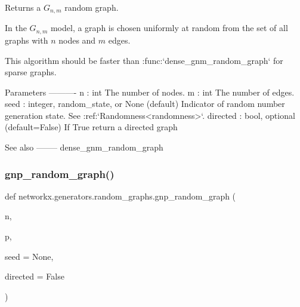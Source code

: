 \begin{DoxyVerb}Returns a $G_{n,m}$ random graph.

In the $G_{n,m}$ model, a graph is chosen uniformly at random from the set
of all graphs with $n$ nodes and $m$ edges.

This algorithm should be faster than :func:`dense_gnm_random_graph` for
sparse graphs.

Parameters
----------
n : int
    The number of nodes.
m : int
    The number of edges.
seed : integer, random_state, or None (default)
    Indicator of random number generation state.
    See :ref:`Randomness<randomness>`.
directed : bool, optional (default=False)
    If True return a directed graph

See also
--------
dense_gnm_random_graph\end{DoxyVerb}
 \mbox{\label{namespacenetworkx_1_1generators_1_1random__graphs_aa7e49cce8e524a491561ad43a9384ba2}} 
\subsubsection{\texorpdfstring{gnp\+\_\+random\+\_\+graph()}{gnp\_random\_graph()}}
{\footnotesize\ttfamily def networkx.\+generators.\+random\+\_\+graphs.\+gnp\+\_\+random\+\_\+graph (\begin{DoxyParamCaption}\item[{}]{n,  }\item[{}]{p,  }\item[{}]{seed = {\ttfamily None},  }\item[{}]{directed = {\ttfamily False} }\end{DoxyParamCaption})}

